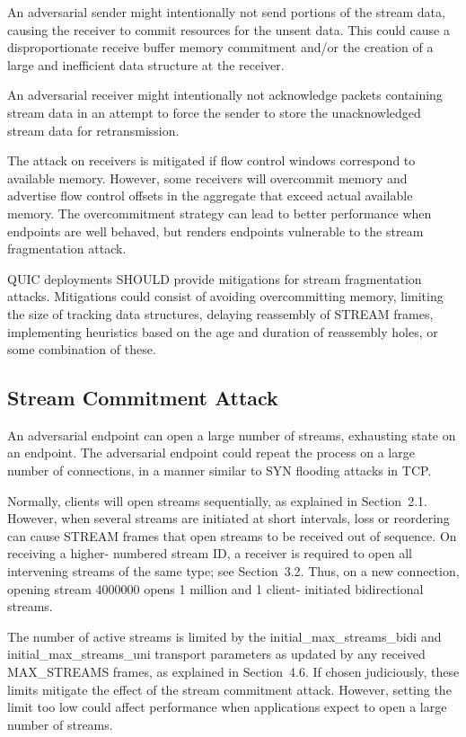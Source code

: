 \documentclass{article}
\begin{document}
An adversarial sender might intentionally not send portions of the stream data, causing the receiver to commit resources for the unsent data.  This could cause a disproportionate receive buffer memory commitment and/or the creation of a large and inefficient data structure at the receiver.

An adversarial receiver might intentionally not acknowledge packets containing stream data in an attempt to force the sender to store the unacknowledged stream data for retransmission.

The attack on receivers is mitigated if flow control windows correspond to available memory.  However, some receivers will overcommit memory and advertise flow control offsets in the aggregate that exceed actual available memory.  The overcommitment strategy can lead to better performance when endpoints are well behaved, but renders endpoints vulnerable to the stream fragmentation attack.

QUIC deployments SHOULD provide mitigations for stream fragmentation attacks.  Mitigations could consist of avoiding overcommitting memory, limiting the size of tracking data structures, delaying reassembly of STREAM frames, implementing heuristics based on the age and duration of reassembly holes, or some combination of these.

\subsection{Stream Commitment Attack}

An adversarial endpoint can open a large number of streams, exhausting state on an endpoint.  The adversarial endpoint could repeat the process on a large number of connections, in a manner similar to SYN flooding attacks in TCP.

Normally, clients will open streams sequentially, as explained in Section~2.1.  However, when several streams are initiated at short intervals, loss or reordering can cause STREAM frames that open streams to be received out of sequence.  On receiving a higher- numbered stream ID, a receiver is required to open all intervening streams of the same type; see Section~3.2.  Thus, on a new connection, opening stream 4000000 opens 1 million and 1 client- initiated bidirectional streams.

The number of active streams is limited by the initial\_max\_streams\_bidi and initial\_max\_streams\_uni transport parameters as updated by any received MAX\_STREAMS frames, as explained in Section~4.6.  If chosen judiciously, these limits mitigate the effect of the stream commitment attack.  However, setting the limit too low could affect performance when applications expect to open a large number of streams.
\end{document}
